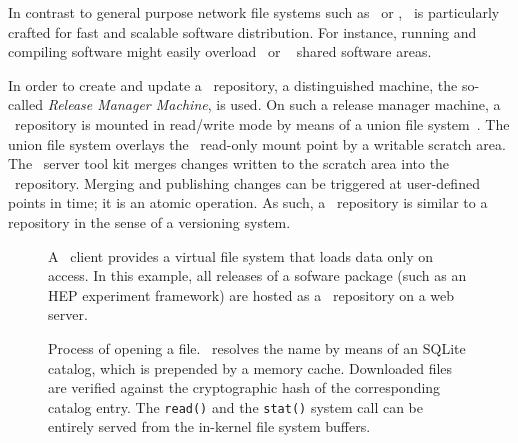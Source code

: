 In contrast to general purpose network file systems such as \nfs\ or \afs, \cvmfs\ is particularly crafted for fast and scalable software distribution.
For instance, running and compiling software might easily overload \nfs\ or ~\cite{lustre03} shared software areas.

In order to create and update a \cvmfs\ repository, a distinguished machine, the so-called \emph{Release Manager Machine}, is used.
On such a release manager machine, a \cvmfs\ repository is mounted in read/write mode by means of a union file system~\cite{unionfs04}.
The union file system overlays the \cvmfs\ read-only mount point by a writable scratch area.
The \cvmfs\ server tool kit merges changes written to the scratch area into the \cvmfs\ repository.
Merging and publishing changes can be triggered at user-defined points in time; it is an atomic operation.
As such, a \cvmfs\ repository is similar to a repository in the sense of a versioning system.

\begin{figure}
	\begin{center}
		\resizebox{\textwidth}{!}{}
	\end{center}
	\caption{A \cvmfs\ client provides a virtual file system that loads data only on access.  
		In this example, all releases of a sofware package (such as an HEP experiment framework) are hosted as a \cvmfs\ repository on a web server.}
	\label{fig:concept}
\end{figure}

\begin{figure}
	\begin{center}
		
	\end{center}
	\caption{Process of opening a file. \cvmfs\ resolves the name by means of an SQLite catalog, which is prepended by a memory cache. 
		Downloaded files are verified against the cryptographic hash of the corresponding catalog entry. 
		The \texttt{read()} and the \texttt{stat()} system call can be entirely served from the in-kernel file system buffers.}
	\label{fig:fuse}
\end{figure}
